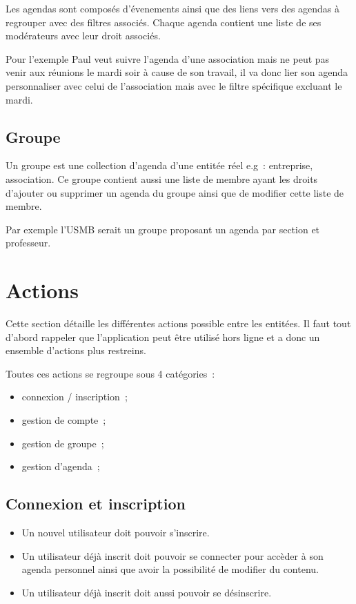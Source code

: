 \documentclass[a4paper,12pt]{article}
\begin{document}
Les agendas sont composés d'évenements ainsi que des liens vers des agendas à regrouper avec des filtres associés.
Chaque agenda contient une liste de ses modérateurs avec leur droit associés.

Pour l'exemple Paul veut suivre l'agenda d'une association mais ne peut pas venir aux réunions le mardi soir à cause de son travail, il va donc lier son agenda personnaliser avec celui de l'association mais avec le filtre spécifique excluant le mardi.

\subsection{Groupe}

Un groupe est une collection d'agenda d'une entitée réel e.g~: entreprise, association.
Ce groupe contient aussi une liste de membre ayant les droits d'ajouter ou supprimer un agenda du groupe ainsi que de modifier cette liste de membre.

Par exemple l'USMB serait un groupe proposant un agenda par section et professeur.

\section{Actions}

Cette section détaille les différentes actions possible entre les entitées. Il faut tout d'abord rappeler que l'application peut être utilisé hors ligne et a donc un ensemble d'actions plus restreins.

Toutes ces actions se regroupe sous 4 catégories~:

\begin{itemize}
	\item connexion / inscription~;
	\item gestion de compte~;
	\item gestion de groupe~;
	\item gestion d'agenda~;
\end{itemize}

\subsection{Connexion et inscription}

\begin{itemize}
	\item Un nouvel utilisateur doit pouvoir s'inscrire.
	\item Un utilisateur déjà inscrit doit pouvoir se connecter pour accèder à son agenda personnel ainsi que avoir la possibilité de modifier du contenu.
	\item Un utilisateur déjà inscrit doit aussi pouvoir se désinscrire.
\end{itemize}
\end{document}
